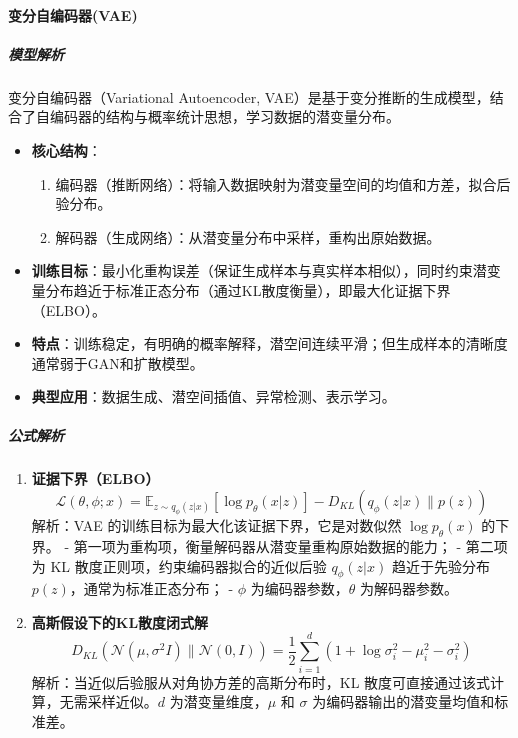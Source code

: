 \documentclass[12pt]{article}
\begin{document}
\paragraph{变分自编码器(VAE)}
\subparagraph{模型解析}
变分自编码器（Variational Autoencoder, VAE）是基于变分推断的生成模型，结合了自编码器的结构与概率统计思想，学习数据的潜变量分布。
\begin{itemize}
    \item \textbf{核心结构}：
    \begin{enumerate}
        \item 编码器（推断网络）：将输入数据映射为潜变量空间的均值和方差，拟合后验分布。
        \item 解码器（生成网络）：从潜变量分布中采样，重构出原始数据。
    \end{enumerate}
    \item \textbf{训练目标}：最小化重构误差（保证生成样本与真实样本相似），同时约束潜变量分布趋近于标准正态分布（通过KL散度衡量），即最大化证据下界（ELBO）。
    \item \textbf{特点}：训练稳定，有明确的概率解释，潜空间连续平滑；但生成样本的清晰度通常弱于GAN和扩散模型。
    \item \textbf{典型应用}：数据生成、潜空间插值、异常检测、表示学习。
\end{itemize}

\subparagraph{公式解析}
\begin{enumerate}
    \item \textbf{证据下界（ELBO）}
    \[
    \mathcal{L}(\theta,\phi; x) = \mathbb{E}_{z\sim q_\phi(z|x)} \left[ \log p_\theta(x|z) \right] - D_{KL}\left( q_\phi(z|x) \parallel p(z) \right)
    \]
    解析：VAE 的训练目标为最大化该证据下界，它是对数似然 $\log p_\theta(x)$ 的下界。
    - 第一项为重构项，衡量解码器从潜变量重构原始数据的能力；
    - 第二项为 KL 散度正则项，约束编码器拟合的近似后验 $q_\phi(z|x)$ 趋近于先验分布 $p(z)$，通常为标准正态分布；
    - $\phi$ 为编码器参数，$\theta$ 为解码器参数。

    \item \textbf{高斯假设下的KL散度闭式解}
    \[
    D_{KL}\left(\mathcal{N}(\mu,\sigma^2 I) \parallel \mathcal{N}(0,I)\right) = \frac{1}{2} \sum_{i=1}^d \left( 1 + \log \sigma_i^2 - \mu_i^2 - \sigma_i^2 \right)
    \]
    解析：当近似后验服从对角协方差的高斯分布时，KL 散度可直接通过该式计算，无需采样近似。$d$ 为潜变量维度，$\mu$ 和 $\sigma$ 为编码器输出的潜变量均值和标准差。
\end{enumerate}
\end{document}
